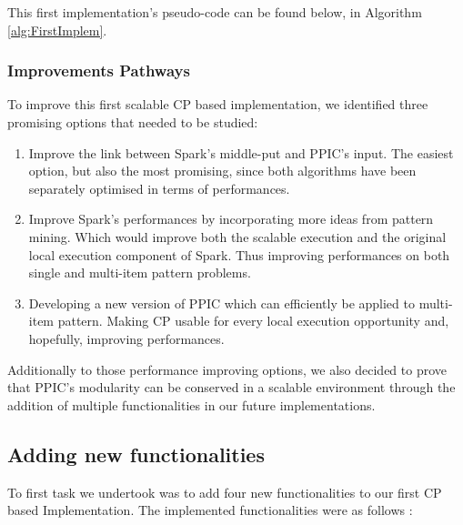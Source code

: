 \documentclass{eplmastersthesis}
\begin{document}
This first implementation's pseudo-code can be found below, in Algorithm \ref{alg:FirstImplem}.

\subsubsection{Improvements Pathways}

To improve this first scalable CP based implementation, we identified three promising options that needed to be studied:

\begin{enumerate}
	\item Improve the link between Spark's middle-put and PPIC's input. The easiest option, but also the most promising, since both algorithms have been separately optimised in terms of performances.
	\item Improve Spark's performances by incorporating more ideas from pattern mining.
Which would improve both the scalable execution and the original local execution component of Spark. Thus improving performances on both single and multi-item pattern problems.
	\item Developing a new version of PPIC which can efficiently be applied to multi-item pattern. Making CP usable for every local execution opportunity and, hopefully, improving performances.
\end{enumerate}

Additionally to those performance improving options, we also decided to prove that PPIC's modularity can be conserved in a scalable environment through the addition of multiple  functionalities in our future implementations.

\subsection{Adding new functionalities}

To first task we undertook was to add four new functionalities to our first CP based Implementation. The implemented functionalities were as follows :
\end{document}
